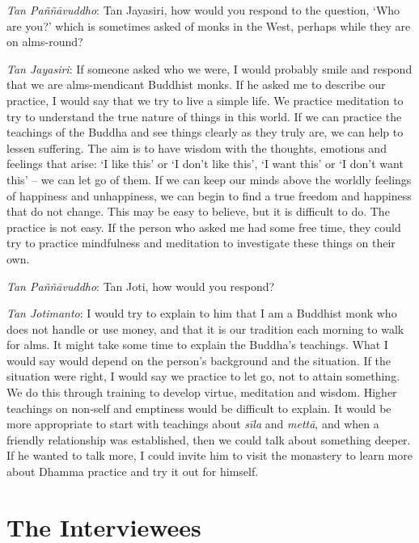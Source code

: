 \emph{Tan Paññāvuddho}: Tan Jayasiri, how would you respond to the
question, `Who are you?' which is sometimes asked of monks in the West, 
perhaps while they are on alms-round? 

\emph{Tan Jayasiri}: If someone asked who we were, I would probably
smile and respond that we are alms-mendicant Buddhist monks. If he asked
me to describe our practice, I would say that we try to live a simple
life. We practice meditation to try to understand the true nature of
things in this world. If we can practice the teachings of the Buddha and
see things clearly as they truly are, we can help to lessen suffering. 
The aim is to have wisdom with the thoughts, emotions and feelings that
arise: `I like this' or `I don't like this', `I want this' or `I don't
want this' -- we can let go of them. If we can keep our minds above the
worldly feelings of happiness and unhappiness, we can begin to find a
true freedom and happiness that do not change. This may be easy to
believe, but it is difficult to do. The practice is not easy. If the
person who asked me had some free time, they could try to practice
mindfulness and meditation to investigate these things on their own. 

\emph{Tan Paññāvuddho}: Tan Joti, how would you respond? 

\emph{Tan Jotimanto}: I would try to explain to him that I am a Buddhist
monk who does not handle or use money, and that it is our tradition each
morning to walk for alms. It might take some time to explain the
Buddha's teachings. What I would say would depend on the person's
background and the situation. If the situation were right, I would say
we practice to let go, not to attain something. We do this through
training to develop virtue, meditation and wisdom. Higher teachings on
non-self and emptiness would be difficult to explain. It would be more
appropriate to start with teachings about \emph{sīla} and \emph{mettā}, 
and when a friendly relationship was established, then we could talk
about something deeper. If he wanted to talk more, I could invite him to
visit the monastery to learn more about Dhamma practice and try it out
for himself. 

\dividerRule

\section{The Interviewees}

